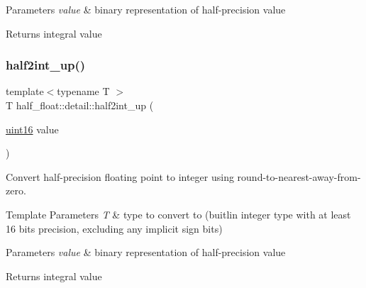 \begin{DoxyParams}{Parameters}
{\em value} & binary representation of half-\/precision value \\
\hline
\end{DoxyParams}
\begin{DoxyReturn}{Returns}
integral value 
\end{DoxyReturn}
\mbox{\label{namespacehalf__float_1_1detail_a1672f8be699238543caa56fc43ed17ee}} 
\subsubsection{\texorpdfstring{half2int\+\_\+up()}{half2int\_up()}}
{\footnotesize\ttfamily template$<$typename T $>$ \\
T half\+\_\+float\+::detail\+::half2int\+\_\+up (\begin{DoxyParamCaption}\item[{\hyperlink{namespacehalf__float_1_1detail_a239ec58092b4e4849b444baee1a01088}{uint16}}]{value }\end{DoxyParamCaption})}

Convert half-\/precision floating point to integer using round-\/to-\/nearest-\/away-\/from-\/zero. 
\begin{DoxyTemplParams}{Template Parameters}
{\em T} & type to convert to (buitlin integer type with at least 16 bits precision, excluding any implicit sign bits) \\
\hline
\end{DoxyTemplParams}

\begin{DoxyParams}{Parameters}
{\em value} & binary representation of half-\/precision value \\
\hline
\end{DoxyParams}
\begin{DoxyReturn}{Returns}
integral value 
\end{DoxyReturn}
\mbox{\label{namespacehalf__float_1_1detail_a2d6a65bc1f34f19797f558a31deefe84}} 
